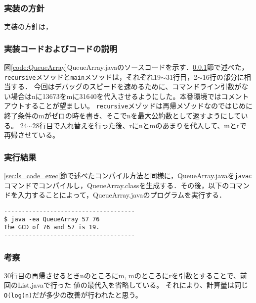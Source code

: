\documentclass[10.5pt,a4paper]{jsarticle}
\newcommand{\figref}[1]{図\ref{#1}}
\newcommand{\secref}[1]{\ref{#1}節}
\begin{document}
\subsubsection{実装の方針}\label{sec:bs_impl_policy}
実装の方針は，

\subsubsection{実装コードおよびコードの説明}

\figref{code:QueueArray}QueueArray.javaのソースコードを示す．\secref{sec:bs_impl_policy}で述べた，\texttt{recursive}メソッドと\texttt{main}メソッドは，それぞれ19$\sim$31行目，2$\sim$16行の部分に相当する．
今回はデバッグのスピードを速めるために、コマンドライン引数がない場合はnに13673をmに31640を代入させるようにした。本番環境ではコメントアウトすることが望ましい。
\texttt{recursive}メゾッドは再帰メゾッドなのではじめに終了条件のmがゼロの時を書き、そこでnを最大公約数として返すようにしている。
24$\sim$28行目で入れ替えを行った後、rにnとmのあまりを代入して、mとrで再帰させている。

\subsubsection{実行結果}

\secref{sec:ls_code_exec}で述べたコンパイル方法と同様に，QueueArray.javaを\texttt{javac}コマンドでコンパイルし，QueueArray.classを生成する．その後，以下のコマンドを入力することによって，QueueArray.javaのプログラムを実行する．
\begin{verbatim}
-------------------------------------
$ java -ea QueueArray 57 76
The GCD of 76 and 57 is 19.
-------------------------------------
\end{verbatim}
\subsubsection{考察}
30行目の再帰させるときnのところにm, mのところにrを引数とすることで、前回のList.javaで行った
値の最代入を省略している。
それにより、計算量は同じ\texttt{O(log(n)}だが多少の改善が行われたと思う。
\end{document}
